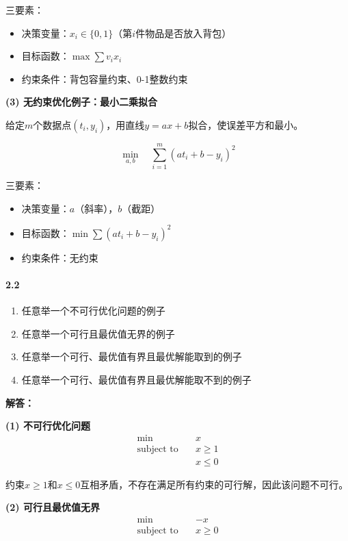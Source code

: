 \documentclass[12pt,a4paper]{article}
\begin{document}
	三要素：
	\begin{itemize}
		\item 决策变量：$x_i \in \{0,1\}$（第$i$件物品是否放入背包）
		\item 目标函数：$\max \sum v_i x_i$
		\item 约束条件：背包容量约束、0-1整数约束
	\end{itemize}
	
	\textbf{(3) 无约束优化例子：最小二乘拟合}
	
	给定$m$个数据点$(t_i, y_i)$，用直线$y = ax + b$拟合，使误差平方和最小。
	
	$$\min_{a,b} \quad \sum_{i=1}^{m} (at_i + b - y_i)^2$$
	
	三要素：
	\begin{itemize}
		\item 决策变量：$a$（斜率），$b$（截距）
		\item 目标函数：$\min \sum (at_i + b - y_i)^2$
		\item 约束条件：无约束
	\end{itemize}
	
	\paragraph{2.2}
    	\begin{enumerate}
		\item 任意举一个不可行优化问题的例子
		\item 任意举一个可行且最优值无界的例子
		\item 任意举一个可行、最优值有界且最优解能取到的例子
        \item 任意举一个可行、最优值有界且最优解能取不到的例子
	\end{enumerate}
	
	\textbf{解答：}
	
	\textbf{(1) 不可行优化问题}
	$$\begin{aligned}
	\min \quad & x \\
	\text{subject to} \quad & x \geq 1 \\
	& x \leq 0
	\end{aligned}$$
	
	约束$x \geq 1$和$x \leq 0$互相矛盾，不存在满足所有约束的可行解，因此该问题不可行。
	
	\textbf{(2) 可行且最优值无界}
	$$\begin{aligned}
	\min \quad & -x \\
	\text{subject to} \quad & x \geq 0
	\end{aligned}$$
	
\end{document}
